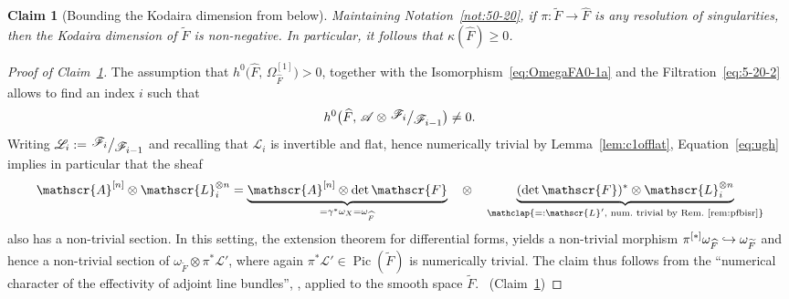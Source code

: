 \documentclass[JEP,XML,SOM,Unicode,published]{cedram}
\let\scr\mathscr
\newcommand\hto{\mathrel{\lhook\joinrel\to}}
\theoremstyle{plain}
\newtheorem{claim}[thm]{Claim}
\theoremstyle{definition}
\numberwithin{equation}{thm}
\numberwithin{enumi}{thm}
\DeclareMathOperator{\Pic}{Pic}
\newcommand{\sA}{\scr{A}}
\newcommand{\sF}{\scr{F}}
\newcommand{\sL}{\scr{L}}
\let\wtilde\widetilde
\let\what\widehat
\newcommand{\factor}[2]{\left. \raise 2pt\hbox{$#1$} \right/\hskip -2pt\raise -2pt\hbox{$#2$}}
\begin{document}
\begin{claim}[Bounding the Kodaira dimension from below]\label{claim:Kodairadim2}
Maintaining Notation~\ref{not:50-20}, if $\pi : \wtilde{F} \to \what{F}$ is any
resolution of singularities, then the Kodaira dimension of $\wtilde{F}$ is
non-negative. In particular, it follows that $\kappa(\what{F}) \geq 0$.
\end{claim}
\begin{proof}[Proof of Claim~\ref{claim:Kodairadim2}]
The assumption that $h^0 \bigl(\what{F},\, \Omega^{[1]}_{\what{F}}\bigr) > 0$,
together with the Isomorphism~\eqref{eq:OmegaFA0-1a} and the
Filtration~\eqref{eq:5-20-2} allows to find an index $i$ such that
\begin{equation}\label{eq:ugh}
h^0\bigl(\what{F},\, \sA \otimes \factor{\sF_i}{\sF_{i-1}} \bigr) \ne 0.
\end{equation}
Writing $\sL_i := \factor{\sF_i}{\sF_{i-1}}$ and recalling that $\sL_i$ is invertible
and flat, hence numerically trivial by Lemma~\ref{lem:c1offlat},
Equation~\eqref{eq:ugh} implies in particular that the sheaf
\[
\sA^{[n]} \otimes \sL^{\otimes n}_i = \underbrace{\sA^{[n]} \otimes \det \sF\vphantom{\sL^{\otimes n}_i}}_{=
\gamma^*\omega_X = \omega_{\what{F}}} \quad \otimes \quad \underbrace{(\det \sF)^* \otimes \sL^{\otimes
n}_i}_{\mathclap{=: \sL' \text{, num.\ trivial by Rem.~\ref{rem:pfbisr}}}}
\]
also has a non-trivial section. In this setting, the extension theorem for
differential forms, \cite[Th.\,4.3]{GKKP11} yields a non-trivial morphism
$\pi^{[*]} \omega_{\what{F}} \hto \omega_{\wtilde{F}}$ and hence a non-trivial section of
$\omega_{\wtilde{F}} \otimes \pi^*\sL'$, where again $\pi^*\sL' \in \Pic(\wtilde{F})$ is
numerically trivial. The claim thus follows from the ``numerical character of
the effectivity of adjoint line bundles'', \cite[Th.\,0.1]{CKP12}, applied to
the smooth space $\wtilde{F}$.
\qedhere~\mbox{(Claim~\ref{claim:Kodairadim2})}
\end{proof}
\end{document}
